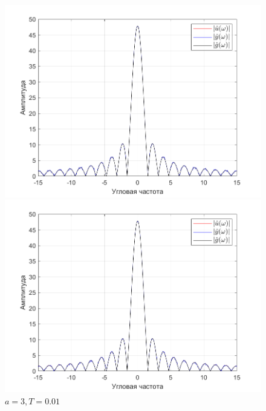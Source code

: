\documentclass[a4paper]{article}
\begin{document}
\begin{figure}[H]
    \begin{minipage}{0.5\textwidth}
        \centering
        \includegraphics[width=\linewidth]{ex1_1/a=3_T=0.001/h3.png}
        \caption{$a = 3, T = 0.001$}
    \end{minipage}
    \begin{minipage}{0.5\textwidth}
        \centering
        \includegraphics[width=\linewidth]{ex1_1/a=3_T=0.01/h3.png}
        \caption{$a = 3, T = 0.01$}
    \end{minipage}
\end{figure}
\end{document}
